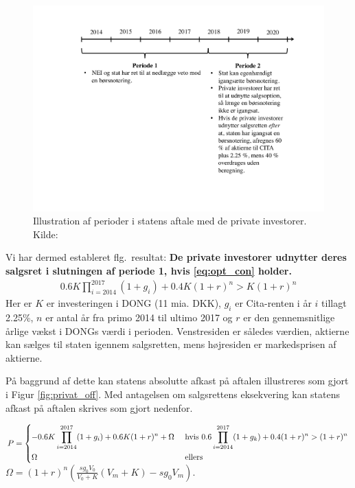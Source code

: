 \documentclass{article}
\begin{document}
\begin{figure}
\includegraphics[scale=0.6]{../figs/perioder}
\caption{Illustration af perioder i statens aftale med de private investorer. Kilde: \citet{FM2013a}}
\label{fig:perioder}
\end{figure}









Vi har dermed estableret flg.\ resultat: \textbf{De private investorer udnytter deres salgsret i slutningen af periode 1, hvis \eqref{eq:opt_con} holder. } 
\begin{align}
0.6K\prod_{i=2014}^{2017}(1+g_i)+0.4K(1+r)^n>K(1+r)^n \label{eq:opt_con}
\end{align}
Her er $K$ er investeringen i DONG (11 mia. DKK), $g_i$ er Cita-renten i år $i$ tillagt 2.25\%, $n$ er antal år fra primo 2014 til ultimo 2017 og $r$ er den gennemsnitlige årlige vækst i DONGs værdi i perioden. Venstresiden er således værdien, aktierne kan sælges til staten igennem salgsretten, mens højresiden er markedsprisen af aktierne.

På baggrund af dette kan statens absolutte afkast på aftalen illustreres som gjort i Figur \ref{fig:privat_off}. Med antagelsen om salgsrettens eksekvering kan statens afkast på aftalen skrives som gjort nedenfor. %

$P=\begin{dcases} 
-0.6K \prod_{i=2014}^{2017} (1+g_i)+0.6K(1+r)^n +\Omega&\text{     hvis    } 0.6\prod_{i=2014}^{2017}(1+g_k)+0.4(1+r)^n>(1+r)^n \\ 
\Omega  &\text{   ellers } 
\end {dcases} $\\
 $\Omega=(1+r)^n\left( \frac{sg_0 V_0}{V_0+K} \left( V_m+K \right)-sg_0 V_m \right)$.
\end{document}
